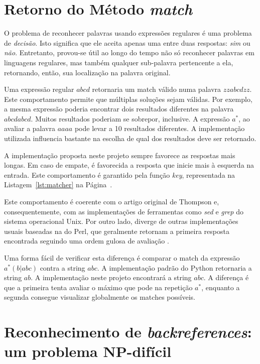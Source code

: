 \documentclass[a4paper,12pt,oneside,onecolumn]{uerj}
\begin{document}
\section{Retorno do Método \emph{match}}

O problema de reconhecer palavras usando expressões regulares é uma problema de \emph{decisão}. Isto significa que ele aceita apenas uma entre duas respostas: \emph{sim} ou \emph{não}. Entretanto, provou-se útil ao longo do tempo não só reconhecer palavras em linguagens regulares, mas também qualquer sub-palavra pertencente a ela, retornando, então, sua localização na palavra original.

Uma expressão regular $abcd$ retornaria um match válido numa palavra $zzabcdzz$. Este comportamento permite que múltiplas soluções sejam válidas. Por exemplo, a mesma expressão poderia encontrar dois resultados diferentes na palavra $abcdabcd$. Muitos resultados poderiam se sobrepor, inclusive. A expressão $a^*$, ao avaliar a palavra $aaaa$ pode levar a 10 resultados diferentes. A implementação utilizada influencia bastante na escolha de qual dos resultados deve ser retornado.

A implementação proposta neste projeto sempre favorece as respostas mais longas. Em caso de empate, é favorecida a resposta que inicie mais à esquerda na entrada. Este comportamento é garantido pela função \emph{key}, representada na Listagem~\ref{lst:matcher} na Página~\pageref{lst:matcher}.

Este comportamento é coerente com o artigo original de Thompson e, consequentemente, com as implementações de ferramentas como \emph{sed} e \emph{grep} do sistema operacional Unix. Por outro lado, diverge de outras implementações usuais baseadas na do Perl, que geralmente retornam a primeira resposta encontrada seguindo uma ordem gulosa de avaliação \cite{bib:Cox07}.

Uma forma fácil de verificar esta diferença é comparar o match da expressão \linebreak
$a^*(b|abc)$ contra a string $abc$. A implementação padrão do Python retornaria a string $ab$. A implementação neste projeto encontrará a string $abc$. A diferença é que a primeira tenta avaliar o máximo que pode na repetição $a^*$, enquanto a segunda consegue visualizar globalmente os matches possíveis.

\section{Reconhecimento de \emph{backreferences}: um problema NP-difícil}
\end{document}
